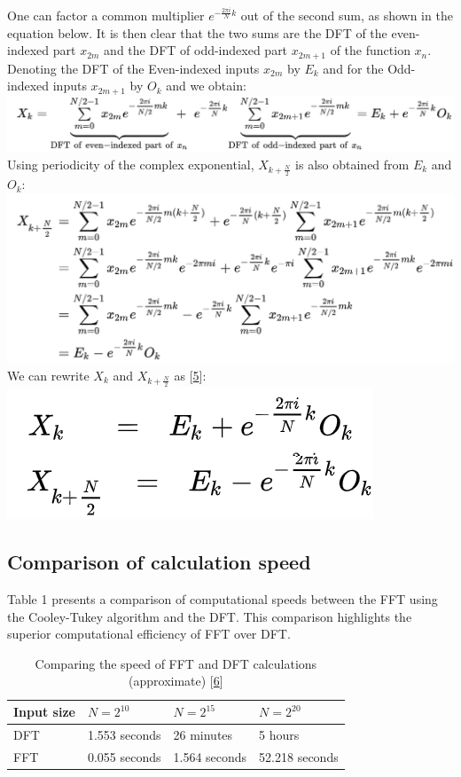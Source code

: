 \documentclass[12pt,a4paper]{article}
\begin{document}
One can factor a common multiplier $e^{-{\frac {2\pi i}{N}}k}$ out of the second sum, as shown in the equation below. It is then clear that the two sums are the DFT of the even-indexed part $x_{2m}$ and the DFT of odd-indexed part $x_{2m+1}$ of the function $x_{n}$. Denoting the DFT of the Even-indexed inputs $x_{2m}$ by $E_{k}$ and for the Odd-indexed inputs $x_{2m+1}$ by $O_{k}$ and we obtain:\\
\includegraphics[width=1\textwidth]{figures/DFT simplification 2.png}
Using periodicity of the complex exponential, $X_{k+{\frac {N}{2}}}$ is also obtained from $E_{k}$ and $O_{k}$:\\
\includegraphics[width=1\linewidth]{figures/DFT simplification 3.png}
We can rewrite $X_{k}$ and $X_{k+{\frac {N}{2}}}$ as [\href{https://en.wikipedia.org/wiki/Cooley%E2%80%93Tukey_FFT_algorithm}{5}]:\\
\includegraphics[width=0.45\linewidth]{figures/Final Cooley-Tukey FFT formula.png}

\subsection{Comparison of calculation speed}\label{subsec1}
\hspace{0.5cm} Table 1 presents a comparison of computational speeds between the FFT using the Cooley-Tukey algorithm and the DFT. This comparison highlights the superior computational efficiency of FFT over DFT.
\begin{table}[!ht]
\caption{Comparing the speed of FFT and DFT calculations (approximate) [\href{https://github.com/theMHD-120/fft}{6}]\label{tab1}}
\begin{threeparttable}
\begin{tabular*}{\columnwidth}{@{\extracolsep\fill}llll@{\extracolsep\fill}}
\toprule
Input size & $N = 2^{10}$ & $N = 2^{15}$ & $N = 2^{20}$\\
\midrule
DFT & 1.553 seconds & 26 minutes & 5 hours \\
FFT & 0.055 seconds & 1.564 seconds & 52.218 seconds \\
\bottomrule
\end{tabular*}
\end{threeparttable}
\end{table}
\end{document}
